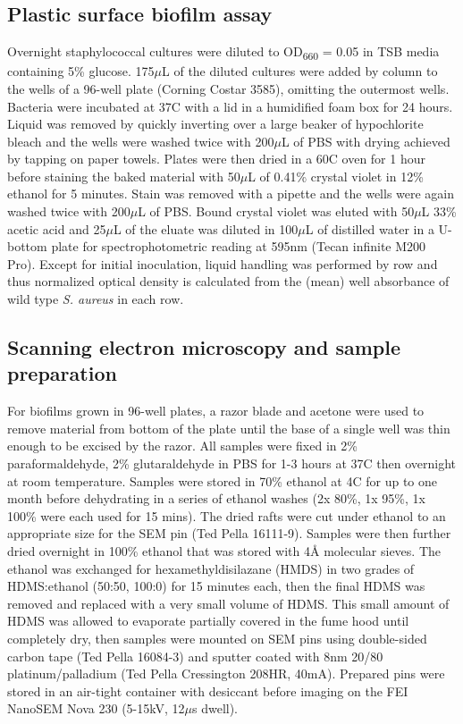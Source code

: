 \documentclass[10pt,letterpaper]{article}
\begin{document}
\subsection*{Plastic surface biofilm assay}
Overnight staphylococcal cultures were diluted to OD\textsubscript{660} = 0.05 in TSB media containing 5\% glucose.
175$\mu$L of the diluted cultures were added by column to the wells of a 96-well plate (Corning Costar 3585), omitting the outermost wells.
Bacteria were incubated at 37\degree C with a lid in a humidified foam box for 24 hours.
Liquid was removed by quickly inverting over a large beaker of hypochlorite bleach and the wells were washed twice with 200$\mu$L of PBS with drying achieved by tapping on paper towels.
Plates were then dried in a 60\degree C oven for 1 hour before staining the baked material with 50$\mu$L of 0.41\% crystal violet in 12\% ethanol for 5 minutes.
Stain was removed with a pipette and the wells were again washed twice with 200$\mu$L of PBS.
Bound crystal violet was eluted with 50$\mu$L 33\% acetic acid and 25$\mu$L of the eluate was diluted in 100$\mu$L of distilled water in a U-bottom plate for spectrophotometric reading at 595nm (Tecan infinite M200 Pro).
Except for initial inoculation, liquid handling was performed by row and thus normalized optical density is calculated from the (mean) well absorbance of wild type \textit{S. aureus} in each row.

\subsection*{Scanning electron microscopy and sample preparation}
For biofilms grown in 96-well plates, a razor blade and acetone were used to remove material from bottom of the plate until the base of a single well was thin enough to be excised by the razor.
All samples were fixed in 2\% paraformaldehyde, 2\% glutaraldehyde in PBS for 1-3 hours at 37\degree C then overnight at room temperature.
Samples were stored in 70\% ethanol at 4\degree C for up to one month before dehydrating in a series of ethanol washes (2x 80\%, 1x 95\%, 1x 100\% were each used for 15 mins).
The dried rafts were cut under ethanol to an appropriate size for the SEM pin (Ted Pella 16111-9).
Samples were then further dried overnight in 100\% ethanol that was stored with 4\r{A} molecular sieves.
The ethanol was exchanged for hexamethyldisilazane (HMDS) in two grades of HDMS:ethanol (50:50, 100:0) for 15 minutes each, then the final HDMS was removed and replaced with a very small volume of HDMS.
This small amount of HDMS was allowed to evaporate partially covered in the fume hood until completely dry, then samples were mounted on SEM pins using double-sided carbon tape (Ted Pella 16084-3) and sputter coated with 8nm 20/80 platinum/palladium (Ted Pella Cressington 208HR, 40mA).
Prepared pins were stored in an air-tight container with desiccant before imaging on the FEI NanoSEM Nova 230 (5-15kV, 12$\mu$s dwell).
\end{document}
